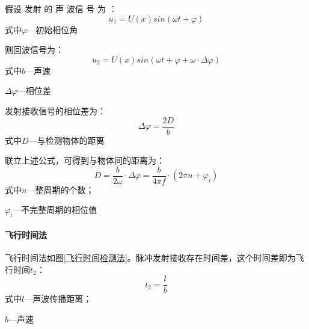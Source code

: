     假设 发射 的 声 波信 号 为 ：
    \begin{equation} 
    	u_1=U(x)sin(\omega t + \varphi)
    \end{equation}
式中\quad$\varphi$---初始相位角\par

则回波信号为：
\begin{equation}
	u_2=U(x)sin(\omega t + \varphi + \omega \cdot{\Delta \varphi})
\end{equation}
式中\quad$b$---声速\par
\quad$\Delta \varphi$---相位差\par
发射接收信号的相位差为：
\begin{equation}
	\Delta \varphi=\frac{2D}{b}
\end{equation}
式中\quad$D$---与检测物体的距离\par
联立上述公式，可得到与物体间的距离为：
\begin{equation}
	D=\frac{b}{2\omega}\cdot \Delta \varphi=\frac{b}{4\pi f}\cdot(2\pi n + \varphi_i)
\end{equation}
式中\quad$n$---整周期的个数；\par
\quad$\varphi_i$---不完整周期的相位值\par
   
    \paragraph{飞行时间法}
    飞行时间法如图\ref{飞行时间检测法}。脉冲发射接收存在时间差，这个时间差即为飞行时间$t_2$：
    \begin{equation}
    	t_2=\frac{l}{b}
    \end{equation}
式中\quad$l$---声波传播距离；\par
\quad$b$---声速\par

